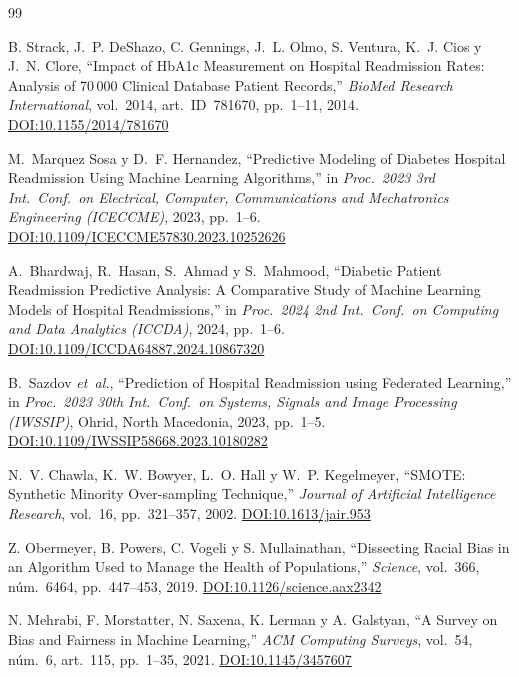\documentclass[11pt,a4paper]{article}
\begin{document}
\begin{thebibliography}{99}

B. Strack, J.~P. DeShazo, C. Gennings, J.~L. Olmo, S. Ventura, K.~J. Cios y J.~N. Clore,
``Impact of HbA1c Measurement on Hospital Readmission Rates: Analysis of 70\,000 Clinical Database Patient Records,''
\textit{BioMed Research International},
vol.~2014, art.~ID~781670, pp.~1--11, 2014.
\href{https://doi.org/10.1155/2014/781670}{DOI:10.1155/2014/781670}

M.~Marquez Sosa y D.~F. Hernandez,
``Predictive Modeling of Diabetes Hospital Readmission Using Machine Learning Algorithms,''
in \textit{Proc.\ 2023 3rd Int.\ Conf.\ on Electrical, Computer, Communications and Mechatronics Engineering (ICECCME)},
2023, pp.~1--6.
\href{https://doi.org/10.1109/ICECCME57830.2023.10252626}{DOI:10.1109/ICECCME57830.2023.10252626}

A.~Bhardwaj, R.~Hasan, S.~Ahmad y S.~Mahmood,
``Diabetic Patient Readmission Predictive Analysis: A Comparative Study of Machine Learning Models of Hospital Readmissions,''
in \textit{Proc.\ 2024 2nd Int.\ Conf.\ on Computing and Data Analytics (ICCDA)},
2024, pp.~1--6.
\href{https://doi.org/10.1109/ICCDA64887.2024.10867320}{DOI:10.1109/ICCDA64887.2024.10867320}

B.~Sazdov \emph{et~al.},
``Prediction of Hospital Readmission using Federated Learning,''
in \textit{Proc.\ 2023 30th Int.\ Conf.\ on Systems, Signals and Image Processing (IWSSIP)},
Ohrid, North Macedonia, 2023, pp.~1--5.
\href{https://doi.org/10.1109/IWSSIP58668.2023.10180282}{DOI:10.1109/IWSSIP58668.2023.10180282}

N.~V. Chawla, K.~W. Bowyer, L.~O. Hall y W.~P. Kegelmeyer,
``SMOTE: Synthetic Minority Over-sampling Technique,''
\textit{Journal of Artificial Intelligence Research},
vol.~16, pp.~321--357, 2002.
\href{https://doi.org/10.1613/jair.953}{DOI:10.1613/jair.953}

Z. Obermeyer, B. Powers, C. Vogeli y S. Mullainathan,
``Dissecting Racial Bias in an Algorithm Used to Manage the Health of Populations,''
\textit{Science},
vol.~366, núm.~6464, pp.~447--453, 2019.
\href{https://doi.org/10.1126/science.aax2342}{DOI:10.1126/science.aax2342}

N. Mehrabi, F. Morstatter, N. Saxena, K. Lerman y A. Galstyan,
``A Survey on Bias and Fairness in Machine Learning,''
\textit{ACM Computing Surveys},
vol.~54, núm.~6, art.~115, pp.~1--35, 2021.
\href{https://doi.org/10.1145/3457607}{DOI:10.1145/3457607}


\end{thebibliography}
\end{document}
